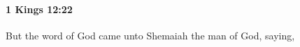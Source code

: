 
		\paragraph{1 Kings 12:22} %
			\label{1KINGS-12-22}

			But the word of God came unto Shemaiah the man of God, saying,


